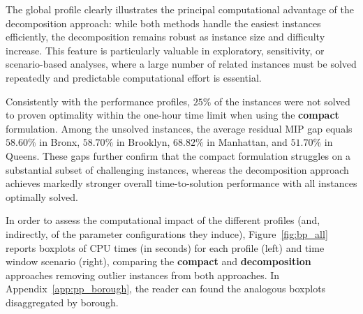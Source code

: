 \documentclass[letter,11pt, reqno]{amsart}
\begin{document}
The global profile clearly illustrates the principal computational advantage of the decomposition approach: while both methods handle the easiest instances efficiently, the decomposition remains robust as instance size and difficulty increase. This feature is particularly valuable in exploratory, sensitivity, or scenario-based analyses, where a large number of related instances must be solved repeatedly and predictable computational effort is essential.

Consistently with the performance profiles, $25\%$ of the instances were not solved to proven optimality within the one-hour time limit when using the \textbf{compact} formulation. Among the unsolved instances, the average residual MIP gap equals $58.60\%$ in Bronx, $58.70\%$ in Brooklyn, $68.82\%$ in Manhattan, and $51.70\%$ in Queens. These gaps further confirm that the compact formulation struggles on a substantial subset of challenging instances, whereas the decomposition approach achieves markedly stronger overall time-to-solution performance with all instances optimally solved.

In order to assess the computational impact of the different profiles (and, indirectly, of the parameter configurations they induce), Figure~\ref{fig:bp_all} reports boxplots of CPU times (in seconds) for each profile (left) and time window scenario (right), comparing the \textbf{compact} and \textbf{decomposition} approaches removing outlier instances from both approaches. In Appendix~\ref{app:pp_borough}, the reader can found the analogous boxplots disaggregated by borough.
\end{document}
